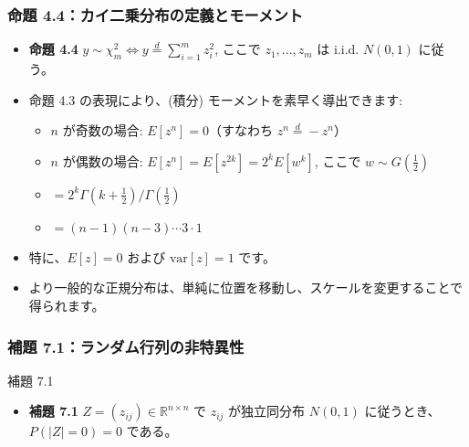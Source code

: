 \documentclass[aspectratio=169]{beamer}
\begin{document}
\begin{frame}
\frametitle{命題 4.4：カイ二乗分布の定義とモーメント}
\begin{itemize}
    \item \textbf{命題 4.4} $y \sim \chi^2_m \iff y \overset{d}{=} \sum_{i=1}^{m} z_i^2$, ここで $z_1,...,z_m$ は i.i.d. $N(0, 1)$ に従う。
    \item 命題 4.3 の表現により、(積分) モーメントを素早く導出できます:
    \begin{itemize}
        \item $n$ が奇数の場合: $E[z^n] = 0$（すなわち $z^n \overset{d}{=} -z^n$）
        \item $n$ が偶数の場合: $E[z^n] = E[z^{2k}] = 2^k E[w^k]$, ここで $w \sim G(\frac{1}{2})$
        \item $= 2^k \Gamma(k + \frac{1}{2})/\Gamma(\frac{1}{2})$
        \item $= (n - 1)(n - 3)\cdots 3 \cdot 1$
    \end{itemize}
    \item 特に、$E[z] = 0$ および $\mathrm{var}[z] = 1$ です。
    \item より一般的な正規分布は、単純に位置を移動し、スケールを変更することで得られます。
\end{itemize}
\end{frame}

\begin{frame}
\frametitle{補題 7.1：ランダム行列の非特異性}
\begin{block}{補題 7.1} 
    \begin{itemize}
        \item \textbf{補題 7.1} $Z=(z_{ij})\in\mathbb{R}^{n\times n}$ で $z_{ij}$ が独立同分布 $N(0,1)$ に従うとき、$P(|Z|=0)=0$ である。
    \end{itemize}
\end{block}
\end{frame}
\end{document}
